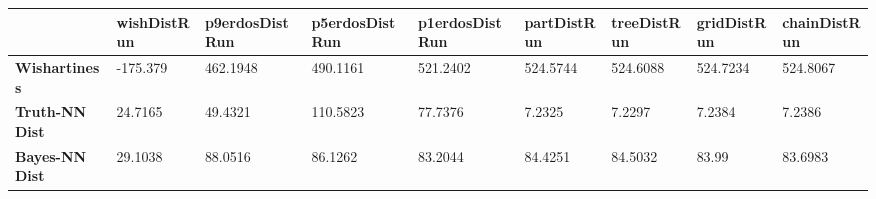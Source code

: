 \begin{tabular}{|l|l|l|l|l|l|l|l|l|}
\hline
&\textbf{wishDistRun}&\textbf{p9erdosDistRun}&\textbf{p5erdosDistRun}&\textbf{p1erdosDistRun}&\textbf{partDistRun}&\textbf{treeDistRun}&\textbf{gridDistRun}&\textbf{chainDistRun}\\\hline
\textbf{Wishartiness}&-175.379&462.1948&490.1161&521.2402&524.5744&524.6088&524.7234&524.8067\\\hline
\textbf{Truth-NN Dist}&24.7165&49.4321&110.5823&77.7376&7.2325&7.2297&7.2384&7.2386\\\hline
\textbf{Bayes-NN Dist}&29.1038&88.0516&86.1262&83.2044&84.4251&84.5032&83.99&83.6983\\\hline
\end{tabular}
